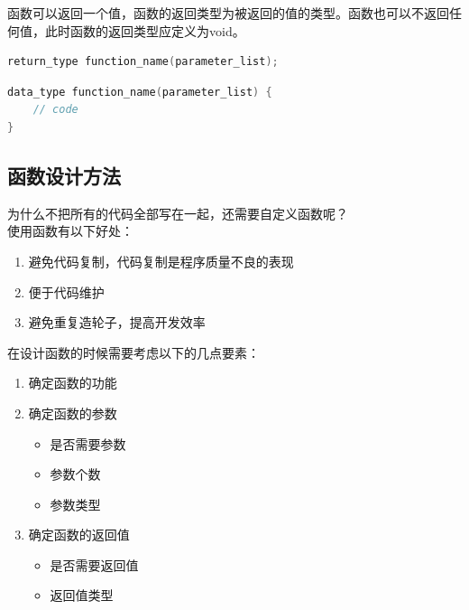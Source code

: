 函数可以返回一个值，函数的返回类型为被返回的值的类型。函数也可以不返回任何值，此时函数的返回类型应定义为void。

\vspace{-0.5cm}

\begin{lstlisting}[language=C]
return_type function_name(parameter_list);
\end{lstlisting}

\vspace{-0.5cm}

\begin{lstlisting}[language=C]
data_type function_name(parameter_list) {
	// code
}
\end{lstlisting}

\vspace{0.5cm}

\subsection{函数设计方法}

为什么不把所有的代码全部写在一起，还需要自定义函数呢？\\

使用函数有以下好处：

\begin{enumerate}
	\item 避免代码复制，代码复制是程序质量不良的表现
	\item 便于代码维护
	\item 避免重复造轮子，提高开发效率
\end{enumerate}

在设计函数的时候需要考虑以下的几点要素：

\begin{enumerate}
	\item 确定函数的功能

	\item 确定函数的参数
	      \begin{itemize}
		      \item 是否需要参数
		      \item 参数个数
		      \item 参数类型
	      \end{itemize}

	\item 确定函数的返回值
	      \begin{itemize}
		      \item 是否需要返回值
		      \item 返回值类型
	      \end{itemize}
\end{enumerate}

